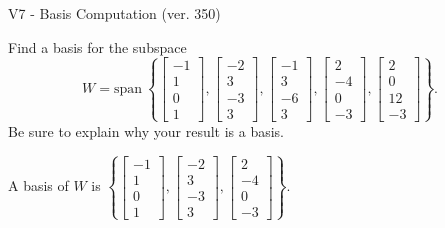 \begin{exercise}
  \begin{exerciseTitle}V7 - Basis Computation (ver. 350)\end{exerciseTitle}
  \begin{exerciseStatement}
    Find a basis for the subspace 
\[W=\mathrm{span}\ \left\{\left[\begin{array}{r}
-1 \\
1 \\
0 \\
1
\end{array}\right] , \left[\begin{array}{r}
-2 \\
3 \\
-3 \\
3
\end{array}\right] , \left[\begin{array}{r}
-1 \\
3 \\
-6 \\
3
\end{array}\right] , \left[\begin{array}{r}
2 \\
-4 \\
0 \\
-3
\end{array}\right] , \left[\begin{array}{r}
2 \\
0 \\
12 \\
-3
\end{array}\right]\right\}.\]
 Be sure to explain why your result is a basis.


  \end{exerciseStatement}
  \begin{exerciseAnswer}
   A basis of \(W\) is  \(\left\{\left[\begin{array}{r}
-1 \\
1 \\
0 \\
1
\end{array}\right] , \left[\begin{array}{r}
-2 \\
3 \\
-3 \\
3
\end{array}\right] , \left[\begin{array}{r}
2 \\
-4 \\
0 \\
-3
\end{array}\right]\right\}\).
  


  \end{exerciseAnswer}
\end{exercise}